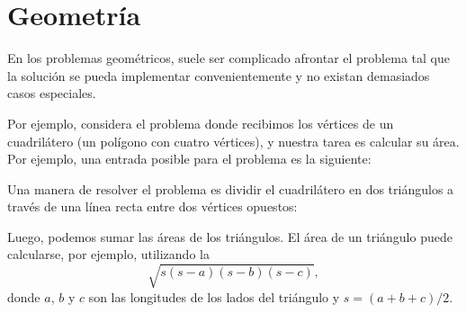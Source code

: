 \chapter{Geometría}


En los problemas geométricos, suele ser complicado afrontar el problema
tal que la solución se pueda implementar convenientemente y no existan
demasiados casos especiales.

Por ejemplo, considera el problema donde recibimos los vértices de un
cuadrilátero (un polígono con cuatro vértices), y nuestra tarea es calcular
su área. Por ejemplo, una entrada posible para el problema es la siguiente:

\begin{center}
\end{center}
Una manera de resolver el problema es dividir el cuadrilátero en dos
triángulos a través de una línea recta entre dos vértices opuestos:
\begin{center}
\end{center}
Luego, podemos sumar las áreas de los triángulos. El área de un triángulo
puede calcularse, por ejemplo, utilizando la 
\[ \sqrt{s (s-a) (s-b) (s-c)},\]
donde $a$, $b$ y $c$ son las longitudes de los lados del triángulo y
$s=(a+b+c)/2$.

